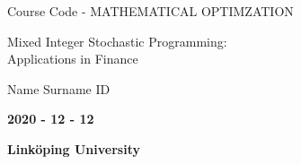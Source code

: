 \AddToShipoutPicture*{\BackgroundPic}
\begin{titlepage}
    \begin{center}
        \vspace*{1cm}
        \large
        Course Code - MATHEMATICAL OPTIMZATION
        
        \vspace*{1cm}
        \huge
        Mixed Integer Stochastic Programming:\\
        Applications in Finance
        
        \vspace*{1cm}
        
        \vspace*{1cm}
        
        \large
        Name Surname ID 

        \vfill
        \textbf{2020 - 12 - 12}
        
        \vspace{0.25cm}
        \textbf{Linköping University}
        \vspace{1cm}
        
    \end{center}
\end{titlepage}
\newpage